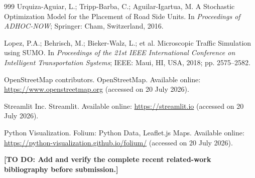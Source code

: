 \documentclass[engproc,proceedingpaper,submit,oneauthor]{Definitions/mdpi}
\newcommand{\todo}[1]{{\color{todored}\textbf{[TO DO: #1]}}}
\begin{document}
\begin{thebibliography}{999}
Urquiza-Aguiar, L.; Tripp-Barba, C.; Aguilar-Igartua, M. A Stochastic Optimization Model for the Placement of Road Side Units. In \emph{Proceedings of ADHOC-NOW}; Springer: Cham, Switzerland, 2016.

Lopez, P.A.; Behrisch, M.; Bieker-Walz, L.; et al. Microscopic Traffic Simulation using SUMO. In \emph{Proceedings of the 21st IEEE International Conference on Intelligent Transportation Systems}; IEEE: Maui, HI, USA, 2018; pp. 2575--2582.

OpenStreetMap contributors. OpenStreetMap. Available online: \url{https://www.openstreetmap.org} (accessed on 20 July 2026).

Streamlit Inc. Streamlit. Available online: \url{https://streamlit.io} (accessed on 20 July 2026).

Python Visualization. Folium: Python Data, Leaflet.js Maps. Available online: \url{https://python-visualization.github.io/folium/} (accessed on 20 July 2026).

\todo{Add and verify the complete recent related-work bibliography before submission.}
\end{thebibliography}

\PublishersNote{}
\end{document}
